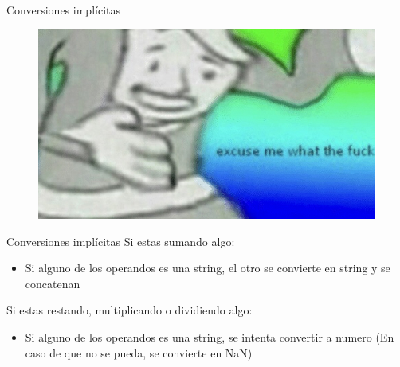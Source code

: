 \documentclass{beamer}
\begin{document}
\begin{frame}{Conversiones implícitas}
    \begin{figure}
        \centering
        \includegraphics[width=\textwidth]{images/excuse_me.jpg}
    \end{figure}
\end{frame}

\begin{frame}{Conversiones implícitas}
Si estas sumando algo:
\begin{itemize}
    \item Si alguno de los operandos es una string, el otro se convierte en string y se concatenan
\end{itemize}

Si estas restando, multiplicando o dividiendo algo:
\begin{itemize}
    \item Si alguno de los operandos es una string, se intenta convertir a numero (En caso de que no se pueda, se convierte en NaN)
\end{itemize}
\end{frame}
\end{document}
